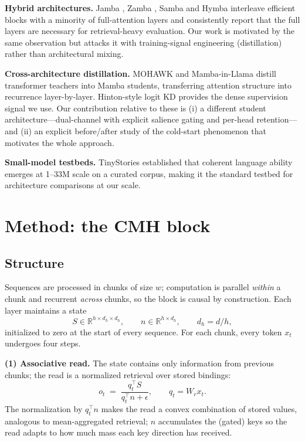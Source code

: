 \documentclass[11pt]{article}
\newcommand{\cmh}{CMH}
\begin{document}
\textbf{Hybrid architectures.} Jamba \cite{waleffe2024jamba}, Zamba
\cite{glorioso2024zamba}, Samba \cite{wang2024samba} and Hymba \cite{wang2024hymba}
interleave efficient blocks with a minority of full-attention layers and consistently
report that the full layers are necessary for retrieval-heavy evaluation. Our work is
motivated by the same observation but attacks it with training-signal engineering
(distillation) rather than architectural mixing.

\textbf{Cross-architecture distillation.} MOHAWK \cite{wang2024mohawk} and Mamba-in-Llama
\cite{wang2024mambaillama} distill transformer teachers into Mamba students, transferring
attention structure into recurrence layer-by-layer. Hinton-style logit KD
\cite{hinton2015distill} provides the dense supervision signal we use. Our contribution
relative to these is (i) a different student architecture---dual-channel with explicit
salience gating and per-head retention---and (ii) an explicit before/after study of the
cold-start phenomenon that motivates the whole approach.

\textbf{Small-model testbeds.} TinyStories \cite{eldan2023tinystories} established that
coherent language ability emerges at 1--33M scale on a curated corpus, making it the
standard testbed for architecture comparisons at our scale.

\section{Method: the \cmh{} block}\label{sec:method}

\subsection{Structure}

Sequences are processed in chunks of size $w$; computation is parallel \emph{within} a
chunk and recurrent \emph{across} chunks, so the block is causal by construction. Each
layer maintains a state
\[
S \in \mathbb{R}^{h \times d_h \times d_h}, \qquad n \in \mathbb{R}^{h \times d_h},
\qquad d_h = d/h,
\]
initialized to zero at the start of every sequence. For each chunk, every token $x_t$
undergoes four steps.

\textbf{(1) Associative read.} The state contains only information from previous chunks;
the read is a normalized retrieval over stored bindings:
\begin{equation}
o_t \;=\; \frac{q_t^{\top} S}{q_t^{\top} n + \epsilon}, \qquad q_t = W_r x_t .
\label{eq:read}
\end{equation}
The normalization by $q_t^\top n$ makes the read a convex combination of stored values,
analogous to mean-aggregated retrieval; $n$ accumulates the (gated) keys so the read
adapts to how much mass each key direction has received.
\end{document}
